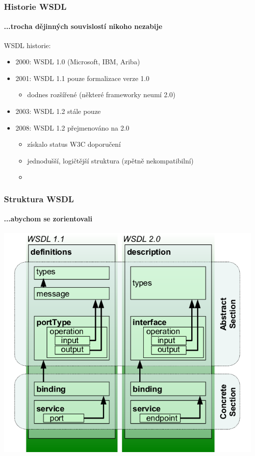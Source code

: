 \documentclass[12pt]{beamer}
\begin{document}
\begin{frame}
  \frametitle{Historie WSDL}
  \framesubtitle{...trocha dějinných souvislostí nikoho nezabije}  

  \begin{block}{WSDL historie:}
    \begin{itemize}
      \item 2000: WSDL 1.0 (Microsoft, IBM, Ariba)
      \item 2001: WSDL 1.1 pouze formalizace verze 1.0
      \begin{itemize}
        \item dodnes rozšířené (některé frameworky neumí 2.0)
      \end{itemize}
      \item 2003: WSDL 1.2 stále pouze 
      \item 2008: WSDL 1.2 přejmenováno na 2.0
      \begin{itemize}
        \item získalo status W3C doporučení
        \item jednodušší, logičtější struktura (zpětně nekompatibilní)
        \item {}
      \end{itemize}
    \end{itemize}
  \end{block}
\end{frame}

\begin{frame}
  \frametitle{Struktura WSDL}
  \framesubtitle{...abychom se zorientovali}

  \begin{center}
    \includegraphics[height=.9\textheight,keepaspectratio=true]{wsdl-11-20.png}
  \end{center}
\end{frame}
\end{document}
